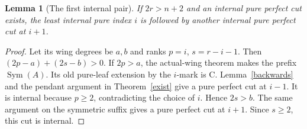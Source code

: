 \documentclass[11pt,a4paper]{article}
\newtheorem{lemma}{Lemma}\newtheorem{theorem}[lemma]{Theorem}
\newcommand{\Sym}{\operatorname{Sym}}
\begin{document}
\begin{lemma}[The first internal pair]\label{pair}
If $2r>n+2$ and an internal pure perfect cut exists, the least
internal pure index $i$ is followed by another internal pure perfect
cut at $i+1$.
\end{lemma}
\begin{proof}
Let its wing degrees be $a,b$ and ranks $p=i$, $s=r-i-1$.
Then $(2p-a)+(2s-b)>0$. If $2p>a$, the actual-wing theorem makes
the prefix $\Sym(A)$. Its old pure-leaf extension by the $i$-mark
is C. Lemma~\ref{backwards} and the pendant argument in
Theorem~\ref{exist} give a pure perfect cut at $i-1$. It is
internal because $p\ge2$, contradicting the choice of $i$.
Hence $2s>b$. The same argument on the symmetric suffix gives
a pure perfect cut at $i+1$. Since $s\ge2$, this cut is internal.
\end{proof}
\end{document}
